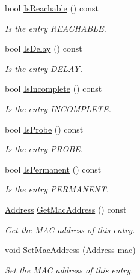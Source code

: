 \begin{DoxyCompactItemize}
bool \hyperlink{classns3_1_1NdiscCache_1_1Entry_a20669f0fad497f394cd37e4b06be7532}{Is\+Reachable} () const 
\begin{DoxyCompactList}\small\item\em Is the entry R\+E\+A\+C\+H\+A\+B\+LE. \end{DoxyCompactList}\item 
bool \hyperlink{classns3_1_1NdiscCache_1_1Entry_ae0f71411baa2c408569afcb286ccb90b}{Is\+Delay} () const 
\begin{DoxyCompactList}\small\item\em Is the entry D\+E\+L\+AY. \end{DoxyCompactList}\item 
bool \hyperlink{classns3_1_1NdiscCache_1_1Entry_a58bbd851ffa0dcb1bd232c031473d991}{Is\+Incomplete} () const 
\begin{DoxyCompactList}\small\item\em Is the entry I\+N\+C\+O\+M\+P\+L\+E\+TE. \end{DoxyCompactList}\item 
bool \hyperlink{classns3_1_1NdiscCache_1_1Entry_acf7695fea86951645ba6540e1217d945}{Is\+Probe} () const 
\begin{DoxyCompactList}\small\item\em Is the entry P\+R\+O\+BE. \end{DoxyCompactList}\item 
bool \hyperlink{classns3_1_1NdiscCache_1_1Entry_aa0c15abed61286a26f87379710a2a6f0}{Is\+Permanent} () const 
\begin{DoxyCompactList}\small\item\em Is the entry P\+E\+R\+M\+A\+N\+E\+NT. \end{DoxyCompactList}\item 
\hyperlink{classns3_1_1Address}{Address} \hyperlink{classns3_1_1NdiscCache_1_1Entry_a59a27116d63e9f6a7907084785b1b8a2}{Get\+Mac\+Address} () const 
\begin{DoxyCompactList}\small\item\em Get the M\+AC address of this entry. \end{DoxyCompactList}\item 
void \hyperlink{classns3_1_1NdiscCache_1_1Entry_ab2df0a5e0398175e102f7529474a39c7}{Set\+Mac\+Address} (\hyperlink{classns3_1_1Address}{Address} mac)
\begin{DoxyCompactList}\small\item\em Set the M\+AC address of this entry. \end{DoxyCompactList}\item 

\end{DoxyCompactItemize}
